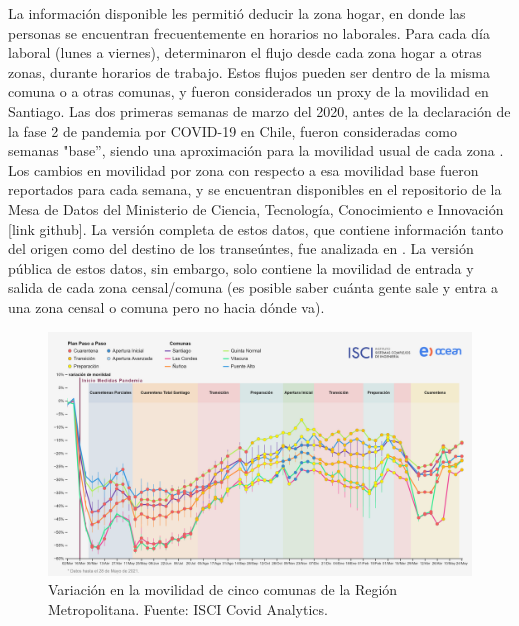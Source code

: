 La información disponible les permitió deducir la zona hogar, en donde las personas se encuentran frecuentemente en horarios no laborales. Para cada día laboral (lunes a viernes), determinaron el flujo desde cada zona hogar a otras zonas, durante horarios de trabajo. Estos flujos pueden ser dentro de la misma comuna o a otras comunas, y fueron considerados un proxy de la movilidad en Santiago. %
Las dos primeras semanas de marzo del 2020, antes de la declaración de la fase 2 de pandemia por COVID-19 en Chile, fueron consideradas como semanas "base”, siendo una aproximación para la movilidad usual de cada zona \cite{Olivares2020}. Los cambios en movilidad por zona con respecto a esa movilidad base fueron reportados para cada semana, y se encuentran disponibles en el repositorio de la Mesa de Datos del Ministerio de Ciencia, Tecnología, Conocimiento e Innovación [link github]. 
La versión completa de estos datos, que contiene información tanto del origen como del destino de los transeúntes, fue analizada en \cite{Carranza2020}. La versión pública de estos datos, sin embargo, solo contiene la movilidad de entrada y salida de cada zona censal/comuna (es posible saber cuánta gente sale y entra a una zona censal o comuna pero no hacia dónde va). 


\begin{figure}[h]
\centering
\includegraphics[width=\textwidth]{img/metodologia/datos/ISCI-movilidad-RM.png}
\caption{Variación en la movilidad de cinco comunas de la Región Metropolitana. Fuente: ISCI Covid Analytics.}
\label{img:ISCI-movilidad-RM}
\end{figure}


